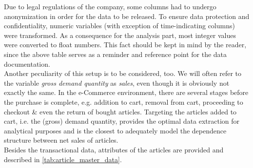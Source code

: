 Due to legal regulations of the company, some columns had to undergo anonymization in order for the data to be released. To ensure data protection and confidentiality, numeric variables (with exception of time-indicating columns) were transformed. As a consequence for the analysis part, most integer values were converted to float numbers. This fact should be kept in mind by the reader, since the above table serves as a reminder and reference point for the data documentation.\\

Another peculiarity of this setup is to be considered, too. We will often refer to the variable \textit{gross demand quantity} as \textit{sales}, even though it is obviously not exactly the same. In the e-Commerce environment, there are several stages before the purchase is complete, e.g. addition to cart, removal from cart, proceeding to checkout \& even the return of bought articles. Targeting the articles added to cart, i.e. the (gross) demand quantity, provides the optimal data extraction for analytical purposes and is the closest to adequately model the dependence structure between net sales of articles.\\

Besides the transactional data, attributes of the articles are provided and described in \autoref{tab:article_master_data}.

